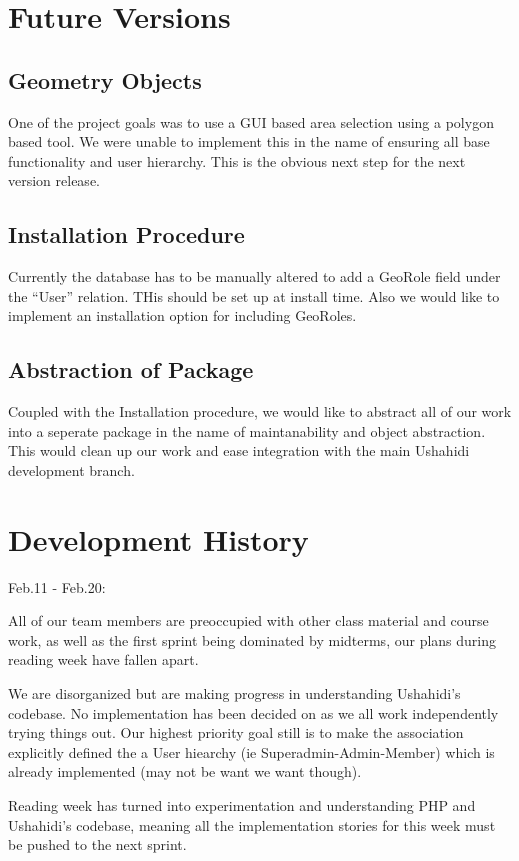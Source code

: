 \documentclass{article}
\begin{document}
\section{Future Versions}
\subsection{Geometry Objects}
One of the project goals was to use a GUI based area selection using a polygon based tool. We were unable to implement this in the name of ensuring all base functionality and user hierarchy. This is the obvious next step for the next version release.
\subsection{Installation Procedure}
Currently the database has to be manually altered to add a GeoRole field under the ``User'' relation. THis should be set up at install time. Also we would like to implement an installation option for including GeoRoles.
\subsection{Abstraction of Package}
Coupled with the Installation procedure, we would like to abstract all of our work into a seperate package in the name of maintanability and object abstraction. This would clean up our work and ease integration with the main Ushahidi development branch.

\section{Development History}

Feb.11 - Feb.20:

    All of our team members are preoccupied with other class material and course work, 
	as well as the first sprint being dominated by midterms, our plans during reading week have fallen apart.

	We are disorganized but are making progress in understanding Ushahidi's codebase.  No implementation has
	been decided on as we all work independently trying things out.  Our highest priority goal still is to 
	make the association explicitly defined the a User hiearchy (ie Superadmin-Admin-Member) which is already
	implemented (may not be want we want though).
		    
	Reading week has turned into experimentation and understanding PHP and Ushahidi's codebase, meaning all the
	implementation stories for this week must be pushed to the next sprint.
\end{document}
